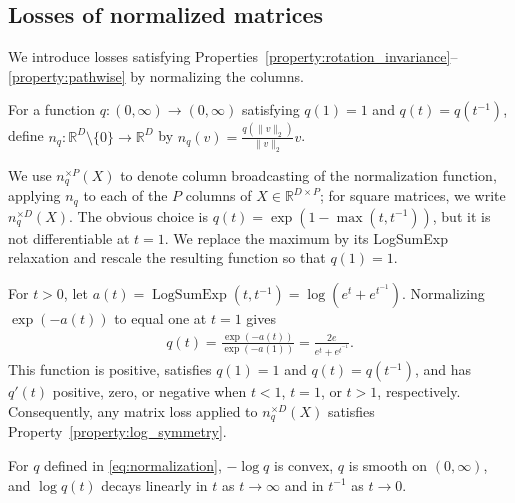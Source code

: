 \subsection{Losses of normalized matrices}
\label{sec:normalization}

We introduce losses satisfying Properties~\ref{property:rotation_invariance}--\ref{property:pathwise} by normalizing the columns.

\begin{definition}
\label{def:symmetric_normalization}
For a function $q:(0,\infty)\to(0,\infty)$ satisfying $q(1)=1$ and $q(t)=q(t^{-1})$, define $n_q:\mathbb R^D\setminus\{0\}\to\mathbb R^D$ by $n_q(v)=\frac{q(\|v\|_2)}{\|v\|_2}v$.
\end{definition}

We use $n_q^{\times P}(X)$ to denote column broadcasting of the normalization function, applying $n_q$ to each of the $P$ columns of $X\in\mathbb R^{D\times P}$; for square matrices, we write $n_q^{\times D}(X)$.
The obvious choice is $q(t)=\exp(1-\max(t,t^{-1}))$, but it is not differentiable at $t=1$.
We replace the maximum by its LogSumExp relaxation \citep{Boyd2004-ql} and rescale the resulting function so that $q(1)=1$.

\begin{proposition}
\label{prop:normalization_logsumexp}
For $t>0$, let $a(t)=\operatorname{LogSumExp}(t,t^{-1})=\log(e^t+e^{t^{-1}})$.
Normalizing $\exp(-a(t))$ to equal one at $t=1$ gives
\begin{align}
q(t)=\frac{\exp(-a(t))}{\exp(-a(1))}=\frac{2e}{e^t+e^{t^{-1}}}.
\label{eq:normalization}
\end{align}
This function is positive, satisfies $q(1)=1$ and $q(t)=q(t^{-1})$, and has $q'(t)$ positive, zero, or negative when $t<1$, $t=1$, or $t>1$, respectively.
Consequently, any matrix loss applied to $n_q^{\times D}(X)$ satisfies Property~\ref{property:log_symmetry}.
\end{proposition}

\begin{proposition}
For $q$ defined in \eqref{eq:normalization}, $-\log q$ is convex, $q$ is smooth on $(0,\infty)$, and $\log q(t)$ decays linearly in $t$ as $t\to\infty$ and in $t^{-1}$ as $t\to0$.
\end{proposition}


